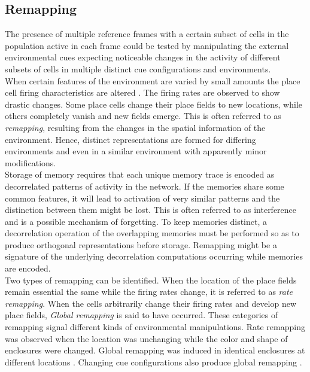 \subsection{Remapping}
\label{remapping}
The presence of multiple reference frames with a certain subset of cells in the population active in each frame could be tested by manipulating the external environmental cues expecting noticeable changes in the activity of different subsets of cells in multiple distinct cue configurations and environments.\\

When certain features of the environment are varied by small amounts the place cell firing characteristics are altered \cite{Kubie1987}. The firing rates are observed to show drastic changes. Some place cells change their place fields to new locations, while others completely vanish and new fields emerge. This is often referred to as \emph{remapping}, resulting from the changes in the spatial information of the environment. Hence, distinct representations are formed for differing environments and even in a similar environment with apparently minor modifications. \\
Storage of memory requires that each unique memory trace is encoded as decorrelated patterns of activity in the network. If the memories share some common features, it will lead to activation of very similar patterns and the distinction between them might be lost. This is often referred to as interference and is a possible mechanism of forgetting. To keep memories distinct, a decorrelation operation of the overlapping memories must be performed so as to produce orthogonal representations before storage. Remapping might be a signature of the underlying decorrelation computations occurring while memories are encoded.\\
Two types of remapping can be identified. When the location of the place fields remain essential the same while the firing rates change, it is referred to as \emph{rate remapping}. When the cells arbitrarily change their firing rates and develop new place fields, \emph{Global remapping} is said to have occurred. These categories of remapping signal different kinds of environmental manipulations. Rate remapping was observed when the location was unchanging while the color and shape of enclosures were changed. Global remapping was induced in identical enclosures at different locations \cite{Leutgeb2005a}. Changing cue configurations also produce global remapping \cite{Leutgeb2005a}.
